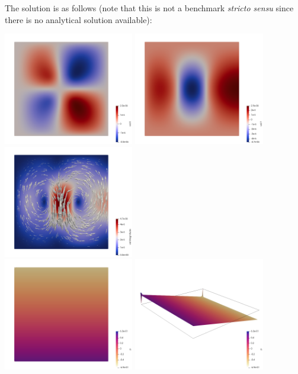 The solution is as follows (note that this is not a benchmark {\it stricto sensu}
since there is no analytical solution available):

\begin{center}
\includegraphics[width=5.7cm]{python_codes/fieldstone_161/results/bench3/u}
\includegraphics[width=5.7cm]{python_codes/fieldstone_161/results/bench3/v}
\includegraphics[width=5.7cm]{python_codes/fieldstone_161/results/bench3/vel}\\
\includegraphics[width=5.7cm]{python_codes/fieldstone_161/results/bench3/press}
\includegraphics[width=5.7cm]{python_codes/fieldstone_161/results/bench3/press2}
\end{center}

